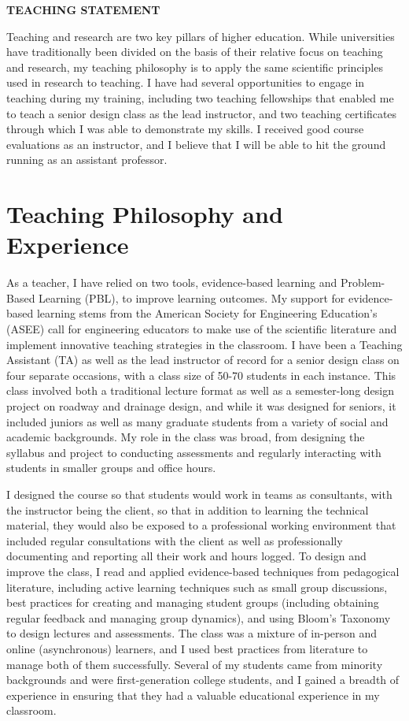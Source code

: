 \documentclass[12pt]{article}
\begin{document}
 \sloppy %
\begin{center}
{\large \uppercase{\textbf{Teaching Statement}}}
\end{center}

Teaching and research are two key pillars of higher education. While universities have traditionally been divided on the basis of their relative focus on teaching and research, my teaching philosophy is to apply the same scientific principles used in research to teaching. I have had several opportunities to engage in teaching during my training, including two teaching fellowships that enabled me to teach a senior design class as the lead instructor, and two teaching certificates through which I was able to demonstrate my skills. I received good course evaluations as an instructor, and I believe that I will be able to hit the ground running as an assistant professor.

\section*{Teaching Philosophy and Experience}
As a teacher, I have relied on two tools, evidence-based learning and Problem-Based Learning (PBL), to improve learning outcomes. My support for evidence-based learning stems from the American Society for Engineering Education's (ASEE) call for engineering educators to make use of the scientific literature and implement innovative teaching strategies in the classroom. I have been a Teaching Assistant (TA) as well as the lead instructor of record for a senior design class on four separate occasions, with a class size of 50-70 students in each instance. This class involved both a traditional lecture format as well as a semester-long design project on roadway and drainage design, and while it was designed for seniors, it included juniors as well as many graduate students from a variety of social and academic backgrounds. My role in the class was broad, from designing the syllabus and project to conducting assessments and regularly interacting with students in smaller groups and office hours. 

I designed the course so that students would work in teams as consultants, with the instructor being the client, so that in addition to learning the technical material, they would also be exposed to a professional working environment that included regular consultations with the client as well as professionally documenting and reporting all their work and hours logged. To design and improve the class, I read and applied evidence-based techniques from pedagogical literature, including active learning techniques such as small group discussions, best practices for creating and managing student groups (including obtaining regular feedback and managing group dynamics), and using Bloom's Taxonomy to design lectures and assessments. The class was a mixture of in-person and online (asynchronous) learners, and I used best practices from literature to manage both of them successfully. Several of my students came from minority backgrounds and were first-generation college students, and I gained a breadth of experience in ensuring that they had a valuable educational experience in my classroom.
\end{document}
